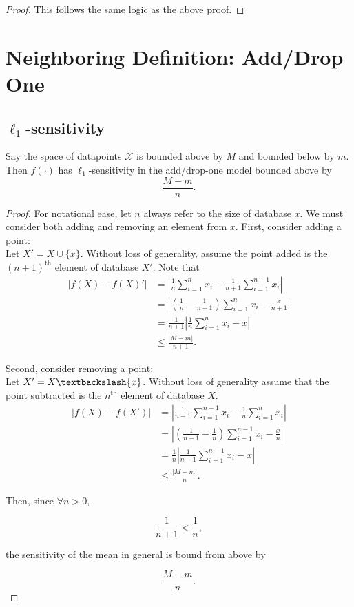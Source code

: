 \documentclass[11pt]{scrartcl} %
\begin{document}
\begin{proof}
This follows the same logic as the above proof.
\end{proof}

\section{Neighboring Definition: Add/Drop One}
\subsection{$\ell_1$-sensitivity}

\begin{theorem}
Say the space of datapoints $\mathcal{X}$ is bounded above by $M$ and bounded below by $m$.
Then $f(\cdot)$ has $\ell_1$-sensitivity in the add/drop-one model bounded above by
$$ \frac{M-m}{n}. $$
\end{theorem}

\begin{proof}
For notational ease, let $n$ always refer to the size of database $x$. We must consider both adding and removing an element from $x$. First, consider adding a point:\\

Let $X' = X \cup \{x\}$. Without loss of generality, assume the point added is the $(n+1)^{\text{th}}$ element of database $X'$. Note that
\begin{align*}
\left \vert f(X) - f(X)' \right\vert &= \left\vert \frac{1}{n} \sum_{i=1}^n x_i - \frac{1}{n+1} \sum_{i=1}^{n+1} x_i \right\vert \\
	&= \left\vert \left(\frac{1}{n} - \frac{1}{n+1}\right) \sum_{i=1}^n x_i - \frac{x}{n+1}\right\vert \\
	&= \frac{1}{n+1} \left\vert \frac{1}{n} \sum_{i=1}^n x_i - x \right\vert \\
	&\le \frac{ \left\vert M - m \right\vert}{n+1}.
\end{align*}

Second, consider removing a point: \\
Let $X' = X\textbackslash\{x\}$. Without loss of generality assume that the point subtracted is the $n^{\text{th}}$ element of database $X$.
\begin{align*}
\left \vert f(X) - f(X') \right\vert &= \left\vert \frac{1}{n-1} \sum_{i=1}^{n-1} x_i - \frac{1}{n} \sum_{i=1}^n x_i \right\vert \\
	&= \left\vert \left(\frac{1}{n-1} - \frac{1}{n}\right) \sum_{i=1}^{n-1} x_i - \frac{x}{n}\right\vert \\
	&= \frac{1}{n} \left\vert \frac{1}{n-1} \sum_{i=1}^{n-1} x_i  - x \right\vert \\
	&\le \frac{\left\vert M-m\right\vert}{n}.
\end{align*}

Then, since $\forall n > 0,$

$$ \frac{1}{n+1} < \frac{1}{n},$$

the sensitivity of the mean in general is bound from above by 

$$ \frac{M-m}{n}.$$
\end{proof}
\end{document}
